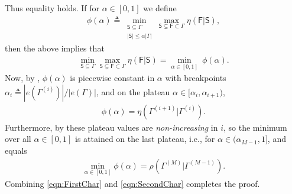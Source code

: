 \documentclass[12pt]{article}
\newcommand{\s}[1]{\mathsf{#1}}
\begin{document}
Thus equality holds. If for $\alpha\in[0,1]$ we define 
\begin{align}
    \phi(\alpha)\triangleq\min_{\substack{\s{S}\subseteq\Gamma\\ |\s{S}|\leq \alpha|\Gamma|}}\max_{\s{S}\subsetneq\s{F}\subset\Gamma}\eta(\s{F}\vert\s{S}),
\end{align}
then the above implies that
\begin{align}
\min_{\s{S}\subseteq \Gamma}\max_{\s{S}\subsetneq\s{F}\subset\Gamma}\eta(\s{F}\vert\s{S})
=
\min_{\alpha\in[0,1]}\ \phi(\alpha).\label{eqn:FirstChar}
\end{align}
Now, by \cite[Thm.~3.6(b)]{LeePerniceRajaramanZadik2025}, $\phi(\alpha)$ is piecewise constant in $\alpha$ with breakpoints $\alpha_i\triangleq|e(\Gamma^{(i)})|/|e(\Gamma)|$, and on the plateau $\alpha\in[\alpha_i,\alpha_{i+1})$,
\begin{align}
\phi(\alpha)=\eta(\Gamma^{(i+1)}\vert\Gamma^{(i)}).
\end{align}
Furthermore, by \cite[Lemma~5.4]{LeePerniceRajaramanZadik2025} these plateau values are \emph{non-increasing} in $i$, so the minimum over all $\alpha\in[0,1]$ is attained on the last plateau, i.e., for $\alpha\in(\alpha_{M-1},1]$, and equals
\begin{align}
\min_{\alpha\in[0,1]}\phi(\alpha)=\rho(\Gamma^{(M)}\vert\Gamma^{(M-1)}).\label{eqn:SecondChar}
\end{align}
Combining \eqref{eqn:FirstChar} and \eqref{eqn:SecondChar} completes the proof.
\end{document}
